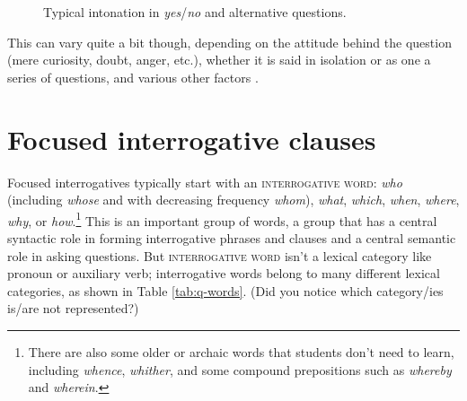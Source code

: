 \begin{figure}
    \centering
    \caption{Typical intonation in \textit{yes}/\textit{no} and alternative questions.}
    \label{fig:question-intonation}
\end{figure}

This can vary quite a bit though, depending on the attitude behind the question (mere curiosity, doubt, anger, etc.), whether it is said in isolation or as one a series of questions, and various other factors \citep{Bartels1999}.

\section{Focused interrogative clauses}\label{sec:focused interrogatives}

Focused interrogatives typically start with an \textsc{interrogative word}: \textit{who} (including \textit{whose} and with decreasing frequency \textit{whom}), \textit{what}, \textit{which}, \textit{when}, \textit{where}, \textit{why}, or \textit{how}.\footnote{There are also some older or archaic words that students don't need to learn, including \textit{whence}, \textit{whither}, and some compound prepositions such as \textit{whereby} and \textit{wherein}.} This is an important group of words, a group that has a central syntactic role in forming interrogative phrases and clauses and a central semantic role in asking questions. But \textsc{interrogative word} isn't a lexical category like pronoun or auxiliary verb; interrogative words belong to many different lexical categories, as shown in Table \ref{tab:q-words}. (Did you notice which category/ies is/are not represented?)

